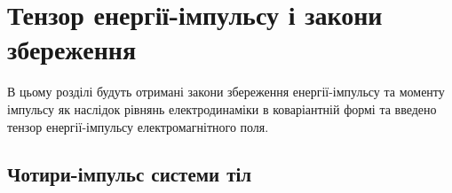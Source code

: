 


\chapter{Тензор енергії-імпульсу і закони збереження}\label{\currfilebase}

В цьому розділі будуть отримані закони збереження енергії-ім\-пуль\-су та моменту імпульсу як наслідок рівнянь
електродинаміки в коваріантній формі та введено тензор енергії-імпульсу електромагнітного
поля.

\section{Чотири-імпульс системи тіл}

